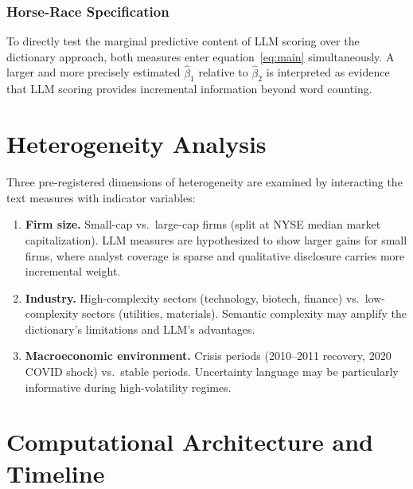 \documentclass[12pt]{article}
\begin{document}
\subsubsection{Horse-Race Specification}

To directly test the marginal predictive content of LLM scoring over the
dictionary approach, both measures enter equation~\eqref{eq:main} simultaneously.
A larger and more precisely estimated $\hat{\beta}_1$ relative to $\hat{\beta}_2$
is interpreted as evidence that LLM scoring provides incremental information
beyond word counting.

\section{Heterogeneity Analysis}

Three pre-registered dimensions of heterogeneity are examined by interacting the
text measures with indicator variables:

\begin{enumerate}[leftmargin=1.5em, noitemsep, label=\textbf{H\arabic*.}]
    \item \textbf{Firm size.} Small-cap vs.\ large-cap firms (split at NYSE
    median market capitalization). LLM measures are hypothesized to show larger
    gains for small firms, where analyst coverage is sparse and qualitative
    disclosure carries more incremental weight.

    \item \textbf{Industry.} High-complexity sectors (technology, biotech,
    finance) vs.\ low-complexity sectors (utilities, materials). Semantic
    complexity may amplify the dictionary's limitations and LLM's advantages.

    \item \textbf{Macroeconomic environment.} Crisis periods (2010--2011
    recovery, 2020 COVID shock) vs.\ stable periods. Uncertainty language may
    be particularly informative during high-volatility regimes.
\end{enumerate}

\section{Computational Architecture and Timeline}
\end{document}
